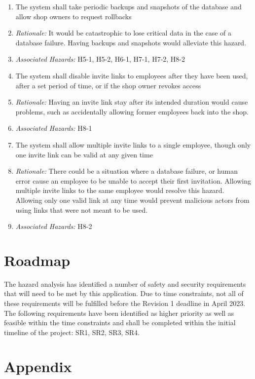 \documentclass{article}
\begin{document}
\begin{enumerate}[label=SR\arabic*.]
	\item The system shall take periodic backups and snapshots of the database and allow shop owners to
	      request rollbacks
	\item[] \emph{Rationale:} It would be catastrophic to lose critical data in the case of a database failure.
		Having backups and snapshots would alleviate this hazard.
	\item[] \emph{Associated Hazards:} H5-1, H5-2, H6-1, H7-1, H7-2, H8-2 \\

	\item The system shall disable invite links to employees after they have been used, after a set period of
	      time, or if the shop owner revokes access
	\item[] \emph{Rationale:} Having an invite link stay after its intended duration would cause problems, such
		as accidentally allowing former employees back into the shop.
	\item[] \emph{Associated Hazards:} H8-1 \\

	\item The system shall allow multiple invite links to a single employee, though only one invite link can
	      be valid at any given time
	\item[] \emph{Rationale:} There could be a situation where a database failure, or human error cause an
		employee to be unable to accept their first invitation. Allowing multiple invite links to the same
		employee would resolve this hazard. Allowing only one valid link at any time would prevent malicious
		actors from using links that were not meant to be used.
	\item[] \emph{Associated Hazards:} H8-2 \\
\end{enumerate}


\section{Roadmap}

The hazard analysis has identified a number of safety and security requirements that will need to
be met by this application. Due to time constraints, not all of these requirements will be
fulfilled before the Revision 1 deadline in April 2023. The following requirements have been
identified as higher priority as well as feasible within the time constraints and shall be
completed within the initial timeline of the project: SR1, SR2, SR3, SR4.

\newpage





\newpage

\section{Appendix}
\end{document}
